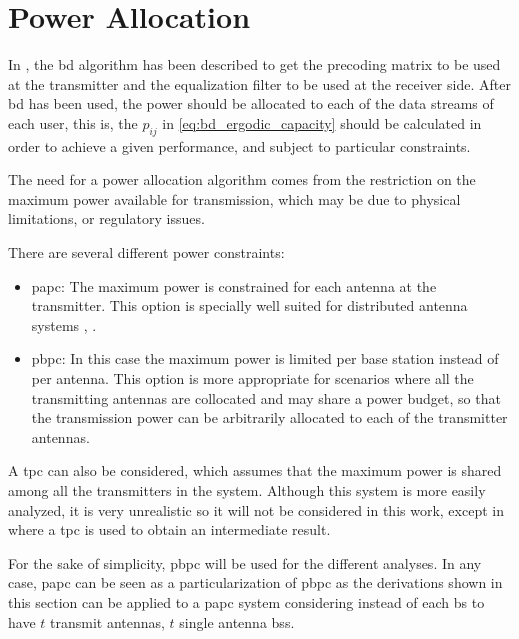 \section{Power Allocation}\label{sec:power_allocation}

In , the \gls{bd} algorithm has been described to get the precoding
matrix to be used at the transmitter and the equalization filter to be used at
the receiver side. After \gls{bd} has been used, the power should be allocated
to each of the data streams of each user, this is, the $p_{ij}$ in
\eqref{eq:bd_ergodic_capacity} should be calculated in order to achieve a given
performance, and subject to particular constraints.

The need for a power allocation algorithm comes from the restriction on the
maximum power available for transmission, which may be due to physical
limitations, or regulatory issues.

There are several different power constraints:

\begin{itemize}
    \item \gls{papc}: The maximum power is constrained for each antenna at the
        transmitter. This option is specially well suited for distributed
        antenna systems \cite{choi07}, \cite{lee12}.
    \item \gls{pbpc}: In this case the maximum power is limited per base station
        instead of per antenna. This option is more appropriate for scenarios
        where all the transmitting antennas are collocated and may share a power
        budget, so that the transmission power can be arbitrarily allocated to
        each of the transmitter antennas.
\end{itemize}

A \gls{tpc} can also be considered, which assumes that the maximum power is
shared among all the transmitters in the system. Although this system is more
easily analyzed, it is very unrealistic so it will not be considered in this
work, except in  where a \gls{tpc} is used to obtain an
intermediate result.

For the sake of simplicity, \gls{pbpc} will be used for the different analyses. In any case, \gls{papc} can be seen as a particularization of \gls{pbpc} as the
derivations shown in this section can be applied to a \gls{papc} system
considering instead of each \gls{bs} to have $t$ transmit antennas, $t$ single
antenna \glspl{bs}.


